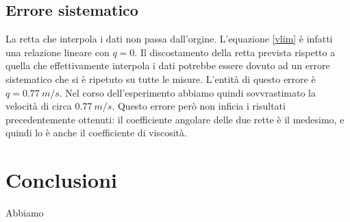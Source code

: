 \subsection*{Errore sistematico}
La retta che interpola i dati non passa dall'orgine. L'equazione \ref{vlim} è infatti una relazione lineare con $q=0$. Il discostamento della retta prevista rispetto a  quella che effettivamente interpola i dati potrebbe essere dovuto ad un errore sistematico che si è ripetuto su tutte le misure. L'entità di questo errore  è $q =0.77 \ m/s$. Nel corso dell'esperimento abbiamo quindi sovvrastimato la velocità di circa $0.77 \ m/s$. Questo errore però non inficia i risultati precedentemente ottenuti: il coefficiente angolare delle due rette è il medesimo, e quindi lo è anche il coefficiente di viscosità.

\section{Conclusioni}
Abbiamo 
